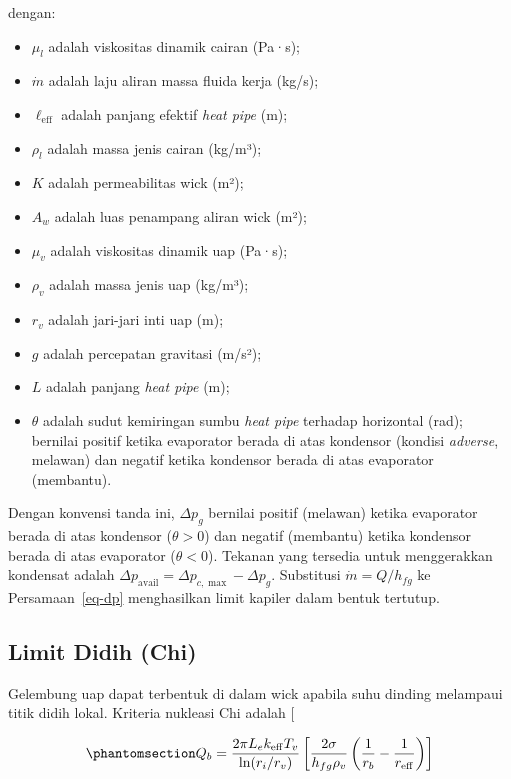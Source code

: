 \documentclass[
  indonesian,
  12pt,
  a4paper,
]{report}
\providecommand{\tightlist}{%
  \setlength{\itemsep}{0pt}\setlength{\parskip}{0pt}}
\begin{document}
dengan:

\begin{itemize}
\tightlist
\item
  \(\mu_l\) adalah viskositas dinamik cairan (Pa·s);
\item
  \(\dot{m}\) adalah laju aliran massa fluida kerja (kg/s);
\item
  \(\ell_{\mathrm{eff}}\) adalah panjang efektif \emph{heat pipe} (m);
\item
  \(\rho_l\) adalah massa jenis cairan (kg/m³);
\item
  \(K\) adalah permeabilitas wick (m²);
\item
  \(A_w\) adalah luas penampang aliran wick (m²);
\item
  \(\mu_v\) adalah viskositas dinamik uap (Pa·s);
\item
  \(\rho_v\) adalah massa jenis uap (kg/m³);
\item
  \(r_v\) adalah jari-jari inti uap (m);
\item
  \(g\) adalah percepatan gravitasi (m/s²);
\item
  \(L\) adalah panjang \emph{heat pipe} (m);
\item
  \(\theta\) adalah sudut kemiringan sumbu \emph{heat pipe} terhadap
  horizontal (rad); bernilai positif ketika evaporator berada di atas
  kondensor (kondisi \emph{adverse}, melawan) dan negatif ketika
  kondensor berada di atas evaporator (membantu).
\end{itemize}

Dengan konvensi tanda ini, \(\Delta p_g\) bernilai positif (melawan)
ketika evaporator berada di atas kondensor (\(\theta>0\)) dan negatif
(membantu) ketika kondensor berada di atas evaporator (\(\theta<0\)).
Tekanan yang tersedia untuk menggerakkan kondensat adalah
\(\Delta p_{\mathrm{avail}}=\Delta p_{c,\max}-\Delta p_g\). Substitusi
\(\dot{m}=Q/h_{fg}\) ke Persamaan~\ref{eq-dp} menghasilkan limit kapiler
dalam bentuk tertutup.

\subsection{Limit Didih (Chi)}\label{limit-didih-chi}

Gelembung uap dapat terbentuk di dalam wick apabila suhu dinding
melampaui titik didih lokal. Kriteria nukleasi Chi adalah
{[}\citeproc{ref-chi1976}{13}{]}

\begin{equation}\protect\phantomsection\label{eq-boiling}{ Q_b = \frac{2\pi L_e k_{\mathrm{eff}} T_v}{\ln(r_i/r_v)}
   \left[\frac{2\sigma}{h_{fg}\rho_v}
   \left(\frac{1}{r_b}-\frac{1}{r_{\mathrm{eff}}}\right)\right]
   }\end{equation}
\end{document}
